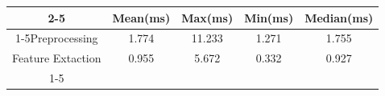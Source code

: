 \documentclass{standalone}
\begin{document}
 
 \begin{tabular}{|c |c |c |c |c |}
\cline{2-5}\cline{2-5} \multicolumn{1}{c |}{ } & Mean(ms) & Max(ms) & Min(ms) & Median(ms)\\ 
\cline{1-5}Preprocessing & 1.774 & 11.233 & 1.271 & 1.755\\ 
 \hhline{|=|=|=|=|=|}Feature Extaction & 0.955 & 5.672 & 0.332 & 0.927\\ 
 \cline{1-5}\hline \end{tabular}
 
\end{document}
